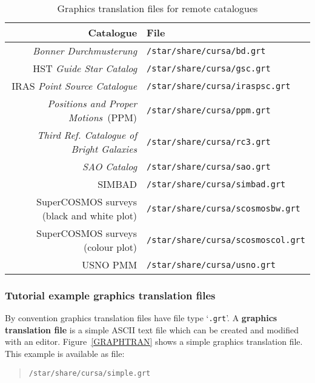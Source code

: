 \documentclass[twoside,11pt]{article}
\renewcommand{\_}{\texttt{\symbol{95}}}
\begin{document}
\begin{table}[htbp]

\begin{center}
\begin{tabular}{rl}
Catalogue & File \\ \hline
{\it Bonner Durchmusterung}                & {\tt /star/share/cursa/bd.grt}  \\
HST {\it Guide Star Catalog}               & {\tt /star/share/cursa/gsc.grt} \\
IRAS {\it Point Source Catalogue}          & {\tt /star/share/cursa/iras\_psc.grt} \\
{\it Positions and Proper Motions}\, (PPM) & {\tt /star/share/cursa/ppm.grt} \\
{\it Third Ref. Catalogue of Bright Galaxies} & {\tt /star/share/cursa/rc3.grt} \\
{\it SAO Catalog}                          & {\tt /star/share/cursa/sao.grt} \\
SIMBAD                                     & {\tt /star/share/cursa/simbad.grt} \\
SuperCOSMOS surveys (black and white plot) & {\tt /star/share/cursa/scosmosbw.grt}  \\
SuperCOSMOS surveys (colour plot)          & {\tt /star/share/cursa/scosmoscol.grt} \\
USNO PMM                                   & {\tt /star/share/cursa/usno.grt} \\
\end{tabular}
\end{center}

\caption{Graphics translation files for remote catalogues \label{EXAMPLEGRT} }

\end{table}

\subsubsection{Tutorial example graphics translation files}

By convention graphics translation files have file type `{\tt .grt}'.
A {\bf graphics translation file} is a simple ASCII text file which
can be created and modified with an editor.  Figure~\ref{GRAPHTRAN}
shows a simple graphics translation file.  This example is available as
file:

\begin{verse}
{\tt /star/share/cursa/simple.grt}
\end{verse}
\end{document}
